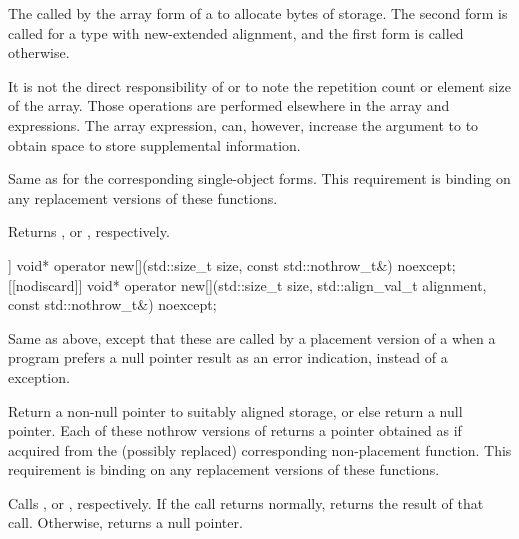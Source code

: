 \begin{itemdescr}
\pnum
\effects
The
called by the array form of a
to allocate
 bytes of storage.
The second form is called for a type with new-extended alignment, and
the first form is called otherwise.
\begin{footnote}
It is not the direct responsibility of
or
to note the repetition count or element size of the array.
Those operations are performed elsewhere in the array
and
expressions.
The array
expression, can, however, increase the  argument to
to obtain space to store supplemental information.
\end{footnote}

\pnum
\replaceable
{}

\pnum
\required
Same as for
the corresponding single-object forms.
This requirement is binding on any replacement versions of these functions.

\pnum
{}
Returns
,
or
,
respectively.
\end{itemdescr}

%
\begin{itemdecl}
[[nodiscard]] void* operator new[](std::size_t size, const std::nothrow_t&) noexcept;
[[nodiscard]] void* operator new[](std::size_t size, std::align_val_t alignment,
                                   const std::nothrow_t&) noexcept;
\end{itemdecl}

\begin{itemdescr}
\pnum
\effects
Same as above, except that these are called by a placement version of a
when a \Cpp{} program prefers a null pointer result as an error indication,
instead of a
exception.

\pnum
\replaceable
{}

\pnum
\required
Return a non-null pointer to suitably aligned storage,
or else return a null pointer.
Each of these nothrow versions of
returns a pointer obtained as if
acquired from the (possibly replaced)
corresponding non-placement function.
This requirement is binding on any replacement versions of these functions.

\pnum
{}
Calls ,
or ,
respectively.
If the call returns normally,
returns the result of that call.
Otherwise, returns a null pointer.
\end{itemdescr}

